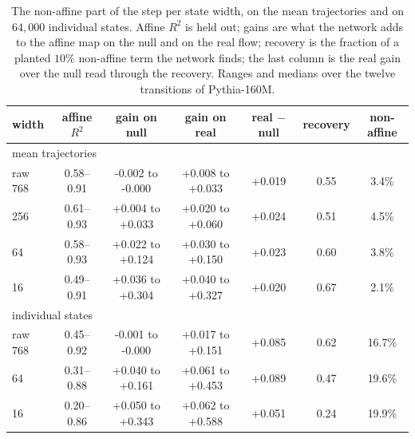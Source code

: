 \begin{table}[t]
\centering
\caption{The non-affine part of the step per state width, on the mean trajectories and on $64{,}000$ individual states. Affine $R^2$ is held out; gains are what the network adds to the affine map on the null and on the real flow; recovery is the fraction of a planted $10\%$ non-affine term the network finds; the last column is the real gain over the null read through the recovery. Ranges and medians over the twelve transitions of Pythia-160M.}
\label{tab:fullwidth}
\footnotesize
\setlength{\tabcolsep}{4pt}
\begin{tabular}{lcccccc}
\toprule
width & affine $R^2$ & gain on null & gain on real & real $-$ null & recovery & non-affine \\
\midrule
\multicolumn{7}{l}{mean trajectories} \\
raw $768$ & 0.58--0.91 & -0.002 to -0.000 & +0.008 to +0.033 & +0.019 & 0.55 & 3.4\% \\
256 & 0.61--0.93 & +0.004 to +0.033 & +0.020 to +0.060 & +0.024 & 0.51 & 4.5\% \\
64 & 0.58--0.93 & +0.022 to +0.124 & +0.030 to +0.150 & +0.023 & 0.60 & 3.8\% \\
16 & 0.49--0.91 & +0.036 to +0.304 & +0.040 to +0.327 & +0.020 & 0.67 & 2.1\% \\
\midrule
\multicolumn{7}{l}{individual states} \\
raw $768$ & 0.45--0.92 & -0.001 to -0.000 & +0.017 to +0.151 & +0.085 & 0.62 & 16.7\% \\
64 & 0.31--0.88 & +0.040 to +0.161 & +0.061 to +0.453 & +0.089 & 0.47 & 19.6\% \\
16 & 0.20--0.86 & +0.050 to +0.343 & +0.062 to +0.588 & +0.051 & 0.24 & 19.9\% \\
\bottomrule
\end{tabular}
\end{table}

